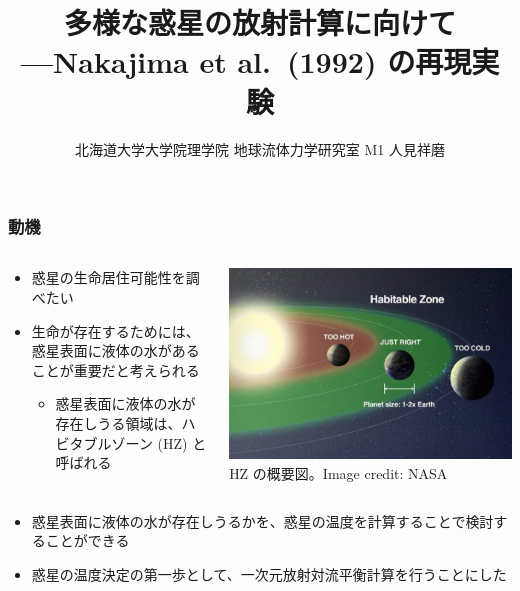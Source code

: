 \documentclass[aspectratio=149]{beamer}
\author{北海道大学大学院理学院 地球流体力学研究室 M1 人見祥磨}
\title{多様な惑星の放射計算に向けて\\---Nakajima et al.\ (1992) の再現実験}
\begin{document}
\begin{frame}
	\maketitle
\end{frame}

\begin{frame}
	\frametitle{動機}
	\begin{columns}[T,onlytextwidth]
		\begin{column}{.5\textwidth}
			\begin{itemize}
				\item 惑星の生命居住可能性を調べたい
				\item 生命が存在するためには、惑星表面に液体の水があることが重要だと考えられる
					\begin{itemize}
						\item 惑星表面に液体の水が存在しうる領域は、ハビタブルゾーン (HZ)
							と呼ばれる
					\end{itemize}
			\end{itemize}
		\end{column}
		\begin{column}{.45\textwidth}
			\centering
			\includegraphics[width=\textwidth]{hz.jpg}\\
			\scriptsize HZ の概要図。Image credit: NASA
		\end{column}
	\end{columns}
	\begin{itemize}
		\item 惑星表面に液体の水が存在しうるかを、惑星の温度を計算することで検討することができる
		\item 惑星の温度決定の第一歩として、一次元放射対流平衡計算を行うことにした
	\end{itemize}
\end{frame}
\end{document}
